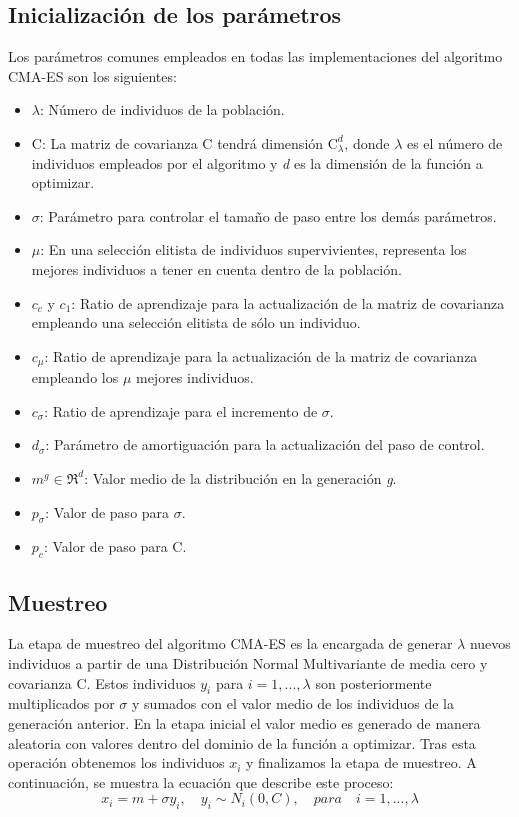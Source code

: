 \bigskip

\subsection{Inicialización de los parámetros}

Los parámetros comunes empleados en todas las implementaciones del algoritmo CMA-ES son los siguientes: 

\begin{itemize}
\item $\lambda$: Número de individuos de la población.
\item C: La matriz de covarianza C tendrá dimensión $\textrm{C}_{\lambda}^{d}$, donde $\lambda$ es el número de individuos empleados por el algoritmo y \textit{d} es la dimensión de la función a optimizar.
\item $\sigma$: Parámetro para controlar el tamaño de paso entre los demás parámetros.
\item $\mu$: En una selección elitista de individuos supervivientes, representa los mejores individuos a tener en cuenta dentro de la población.
\item $c_{c}$ y $c_{1}$: Ratio de aprendizaje para la actualización de la matriz de covarianza empleando una selección elitista de sólo un individuo.
\item $c_{\mu}$: Ratio de aprendizaje para la actualización de la matriz de covarianza empleando los $\mu$ mejores individuos.
\item $c_{\sigma}$: Ratio de aprendizaje para el incremento de $\sigma$.
\item $d_{\sigma}$: Parámetro de amortiguación para la actualización del paso de control.
\item $m^{g} \in \Re^{d}$: Valor medio de la distribución en la generación \textit{g}.
\item $p_{\sigma}$: Valor de paso para $\sigma$.
\item $p_{c}$: Valor de paso para C.
\end{itemize}

\subsection{Muestreo}
La etapa de muestreo del algoritmo CMA-ES es la encargada de generar $\lambda$ nuevos individuos a partir de una Distribución Normal Multivariante de media cero y covarianza C. Estos individuos $y_{i}$ para $ i=1,...,\lambda $ son posteriormente multiplicados por $\sigma$ y sumados con el valor medio de los individuos de la generación anterior. En la etapa inicial el valor medio es generado de manera aleatoria con valores dentro del dominio de la función a optimizar. Tras esta operación obtenemos los individuos $x_{i}$ y finalizamos la etapa de muestreo. A continuación, se muestra la ecuación que describe este proceso: 
\begin{equation} \label{eq:1}
        x_{i} = m + \sigma y_{i},\quad y_{i}\sim N_{i}(0, C),\quad para\quad i=1,...,\lambda 
\end{equation}

